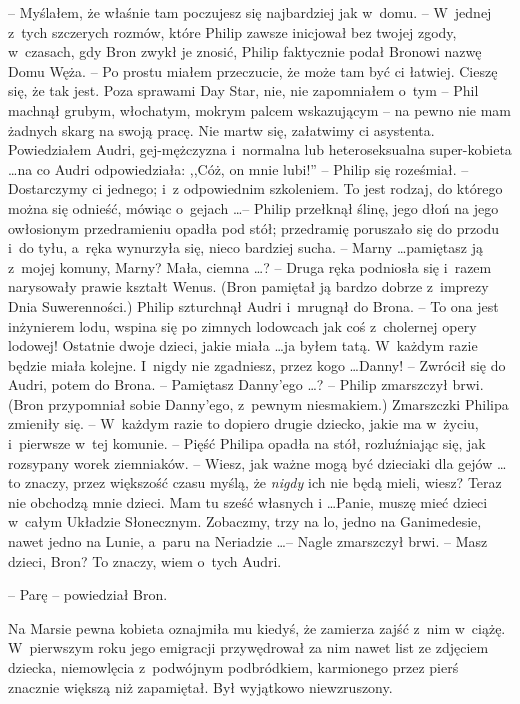 \documentclass[oneside,polish,11pt,rmheadings]{mwbk}
\begin{document}
-- Myślałem, że właśnie tam poczujesz się najbardziej jak w~domu. -- W~jednej z~tych szczerych rozmów, które Philip zawsze inicjował bez twojej zgody, w~czasach, gdy Bron zwykł je znosić, Philip faktycznie podał Bronowi nazwę Domu Węża.  -- Po prostu miałem przeczucie, że może tam być ci łatwiej. Cieszę się, że tak jest. Poza sprawami Day Star, nie, nie zapomniałem o~tym -- Phil machnął grubym, włochatym, mokrym palcem wskazującym -- na pewno nie mam żadnych skarg na swoją pracę. Nie martw się, załatwimy ci asystenta. Powiedziałem Audri, gej-mężczyzna i~normalna lub heteroseksualna super-kobieta \ldots  na co Audri odpowiedziała: ,,Cóż, on mnie lubi!'' -- Philip się roześmiał. -- Dostarczymy ci jednego; i~z odpowiednim szkoleniem. To jest rodzaj, do którego można się odnieść, mówiąc o~gejach \ldots  -- Philip przełknął ślinę, jego dłoń na jego owłosionym przedramieniu opadła pod stół; przedramię poruszało się do przodu i~do tyłu, a~ręka wynurzyła się, nieco bardziej sucha. -- Marny \ldots  pamiętasz ją z~mojej komuny, Marny? Mała, ciemna \ldots ? -- Druga ręka podniosła się i~razem narysowały prawie kształt Wenus. (Bron pamiętał ją bardzo dobrze z~imprezy Dnia Suwerenności.) Philip szturchnął Audri i~mrugnął do Brona. -- To ona jest inżynierem lodu, wspina się po zimnych lodowcach jak coś z~cholernej opery lodowej! Ostatnie dwoje dzieci, jakie miała \ldots  ja byłem tatą. W~każdym razie będzie miała kolejne. I~nigdy nie zgadniesz, przez kogo \ldots  Danny! -- Zwrócił się do Audri, potem do Brona. -- Pamiętasz Danny'ego \ldots ? -- Philip zmarszczył brwi. (Bron przypomniał sobie Danny'ego, z~pewnym niesmakiem.) Zmarszczki Philipa zmieniły się. -- W~każdym razie to dopiero drugie dziecko, jakie ma w~życiu, i~pierwsze w~tej komunie. -- Pięść Philipa opadła na stół, rozluźniając się, jak rozsypany worek ziemniaków. -- Wiesz, jak ważne mogą być dzieciaki dla gejów \ldots  to znaczy, przez większość czasu myślą, że \textit{nigdy }ich nie będą mieli, wiesz? Teraz nie obchodzą mnie dzieci. Mam tu sześć własnych i \ldots   Panie, muszę mieć dzieci w~całym Układzie Słonecznym. Zobaczmy, trzy na lo, jedno na Ganimedesie, nawet jedno na Lunie, a~paru na Neriadzie \ldots  -- Nagle zmarszczył brwi. -- Masz dzieci, Bron? To znaczy, wiem o~tych Audri. 

-- Parę -- powiedział Bron. 

Na Marsie pewna kobieta oznajmiła mu kiedyś, że zamierza zajść z~nim w~ciążę. W~pierwszym roku jego emigracji przywędrował za nim nawet list ze zdjęciem dziecka, niemowlęcia z~podwójnym podbródkiem, karmionego przez pierś znacznie większą niż zapamiętał. Był wyjątkowo niewzruszony. 
\end{document}
